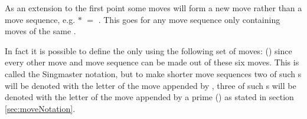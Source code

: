 As an extension to the first point some moves will form a new move rather than a move sequence, e.g. $*$ $=$ . This goes for any move sequence only containing moves of the same \face{}.

In fact it is possible to define the \rubik{} only using the following set of moves:
() since every other move and move sequence can be made out of these six moves.
This is called the Singmaster notation\cite[p. 7]{Joyner02}, but to make shorter move sequences two of such \twist{}s will be denoted with the letter of the move appended by , three of such \twist{}s will be denoted with the letter of the move appended by a prime () as stated in section \ref{sec:moveNotation}.